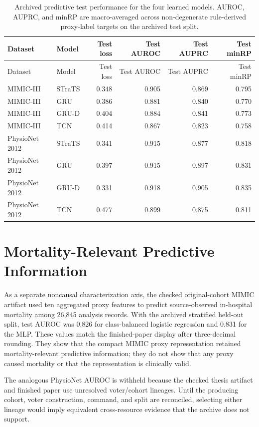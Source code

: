 \begingroup
\small
\setlength{\tabcolsep}{5pt}
\begin{longtable}{@{}llrrrr@{}}
\caption[Archived predictive test performance.]{Archived predictive test performance for the four learned models.  AUROC, AUPRC, and minRP are macro-averaged across non-degenerate rule-derived proxy-label targets on the archived test split.}
\label{tab:results-predictive-performance}\\
\toprule
Dataset & Model & Test loss & Test AUROC & Test AUPRC & Test minRP \\
\midrule
\endfirsthead
\toprule
Dataset & Model & Test loss & Test AUROC & Test AUPRC & Test minRP \\
\midrule
\endhead
MIMIC-III & STraTS & 0.348 & 0.905 & 0.869 & 0.795 \\
MIMIC-III & GRU & 0.386 & 0.881 & 0.840 & 0.770 \\
MIMIC-III & GRU-D & 0.404 & 0.884 & 0.841 & 0.773 \\
MIMIC-III & TCN & 0.414 & 0.867 & 0.823 & 0.758 \\
\addlinespace
PhysioNet 2012 & STraTS & 0.341 & 0.915 & 0.877 & 0.818 \\
PhysioNet 2012 & GRU & 0.397 & 0.915 & 0.897 & 0.831 \\
PhysioNet 2012 & GRU-D & 0.331 & 0.918 & 0.905 & 0.835 \\
PhysioNet 2012 & TCN & 0.477 & 0.899 & 0.875 & 0.811 \\
\bottomrule
\end{longtable}
\endgroup

\section{Mortality-Relevant Predictive Information}
\label{sec:results:mortality-predictive-information}

As a separate noncausal characterization axis, the checked original-cohort MIMIC artifact used ten aggregated proxy features to predict source-observed in-hospital mortality among 26,845 analysis records.  With the archived stratified held-out split, test AUROC was 0.826 for class-balanced logistic regression and 0.831 for the MLP.  These values match the finished-paper display after three-decimal rounding.  They show that the compact MIMIC proxy representation retained mortality-relevant predictive information; they do not show that any proxy caused mortality or that the representation is clinically valid.

The analogous PhysioNet AUROC is withheld because the checked thesis artifact and finished paper use unresolved voter/cohort lineages.  Until the producing cohort, voter construction, command, and split are reconciled, selecting either lineage would imply equivalent cross-resource evidence that the archive does not support.

